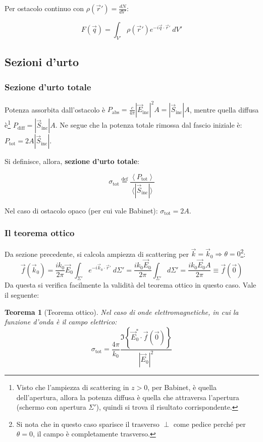\documentclass[10pt, a4paper]{scrartcl}
\numberwithin{equation}{subsection}
\theoremstyle{style1}
\newtheorem{teorema}{Teorema}[section]
\newenvironment{boxenv}[1][]{
    \begin{eqbox}[#1]
    }{
   \end{eqbox}
}
\begin{document}
Per ostacolo continuo con $\rho (\vec{r}') = \frac{d N}{d V'} $:
\begin{boxenv}[]
\begin{equation}
	F(\vec{q})= \int_{V'} \rho (\vec{r}') e^{-i\vec{q}\cdot \vec{r}'}  \ dV'
\end{equation}
\end{boxenv}
\subsection{Sezioni d'urto}
\subsubsection{Sezione d'urto totale}

Potenza assorbita dall'ostacolo \`e $P_\text{abs} = \frac{c}{4\pi} |\vec{E}_\text{inc}| ^2 A= |\vec{S}_\text{inc}| A$, mentre quella diffusa \`e\footnote{Visto che l'ampiezza di scattering in $z>0$, per Babinet, \`e quella dell'apertura, allora la potenza diffusa \`e quella che attraversa l'apertura (schermo con apertura $\Sigma'$), quindi si trova il risultato corrispondente.} $P_\text{diff} = |\vec{S}_\text{inc}| A$. Ne segue che la potenza totale rimossa dal fascio iniziale \`e: $P_\text{tot}= 2 A |\vec{S}_\text{inc}|$. 

Si definisce, allora, \textbf{sezione d'urto totale}:
\begin{boxenv}[]
\begin{equation}
	\sigma _\text{tot} \overset{\text{def}}{=} \frac{\left\langle P_\text{tot} \right\rangle}{\langle|\vec{S}_\text{inc}|\rangle} 
\end{equation}
\end{boxenv}
\noindent Nel caso di ostacolo opaco (per cui vale Babinet): $\sigma _\text{tot}= 2A$.
\subsubsection{Il teorema ottico}
Da sezione precedente, si calcola ampiezza di scattering per $\vec{k}= \vec{k}_0\Rightarrow \theta =0$\footnote{Si nota che in questo caso sparisce il trasverso $\perp$ come pedice perch\'e per $\theta =0$, il campo \`e completamente trasverso.}:
\begin{equation}
	\vec{f}(\vec{k}_0) = \frac{ik_0}{2\pi}\vec{E}_{0} \int_{\Sigma ' }e^{-i \vec{k}_0 \cdot \vec{r}'} \ d\Sigma' = \frac{ik_0\vec{E}_{0} }{2\pi} \int_{\Sigma '} d\Sigma' = \frac{ik_0\vec{E}_{0} A}{2\pi}\equiv \vec{f}(\vec{0})
\end{equation}
Da questa si verifica facilmente la validit\`a del teorema ottico in questo caso. Vale il seguente:
\begin{teorema}
	[Teorema ottico]
	Nel caso di onde elettromagnetiche, in cui la funzione d'onda \`e il campo elettrico:
	\begin{equation}
		\sigma _\text{tot}= \frac{4\pi}{k_0} \frac{\Im \left\{ \vec{E}_0 ^* \cdot \vec{f}(\vec{0}) \right\} }{|\vec{E}_0|^2}
	\end{equation}
\end{teorema}
\end{document}
